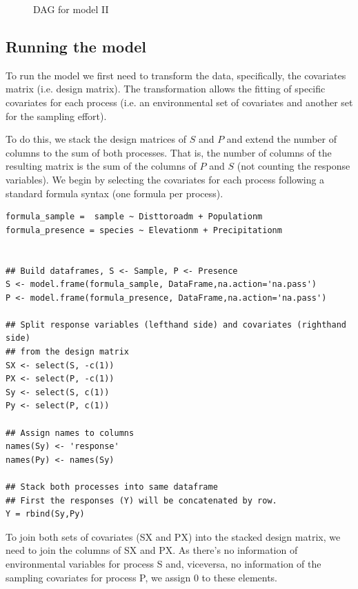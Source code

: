 \documentclass[11pt]{article}
\begin{document}
\begin{figure}
\caption{DAG for model II}
\end{figure}

\subsection{Running the model}
\label{sec:org4790ff1}
To run the model we first need to transform the data, specifically, the covariates matrix (i.e. design matrix). The transformation allows the fitting of specific covariates for each process (i.e. an environmental set of covariates and another set for the sampling effort).

To do this, we stack the design matrices of \(S\) and \(P\) and extend the number of columns to the sum of both processes.
That is, the number of columns of the resulting matrix is the sum of the columns of \(P\) and \(S\) (not counting the response variables). We begin by selecting the covariates for each process following a standard formula syntax (one formula per process).

\begin{verbatim}
formula_sample =  sample ~ Disttoroadm + Populationm
formula_presence = species ~ Elevationm + Precipitationm


## Build dataframes, S <- Sample, P <- Presence
S <- model.frame(formula_sample, DataFrame,na.action='na.pass')
P <- model.frame(formula_presence, DataFrame,na.action='na.pass')

## Split response variables (lefthand side) and covariates (righthand side)
## from the design matrix
SX <- select(S, -c(1))
PX <- select(P, -c(1))
Sy <- select(S, c(1))
Py <- select(P, c(1))

## Assign names to columns
names(Sy) <- 'response'
names(Py) <- names(Sy)

## Stack both processes into same dataframe
## First the responses (Y) will be concatenated by row.
Y = rbind(Sy,Py)
\end{verbatim}

To join both sets of covariates (SX and PX) into the stacked design matrix, we need to join the columns of SX and PX. As there's no information of environmental variables for process S and, viceversa, no information of the sampling covariates for process P, we assign 0 to these elements.
\end{document}

